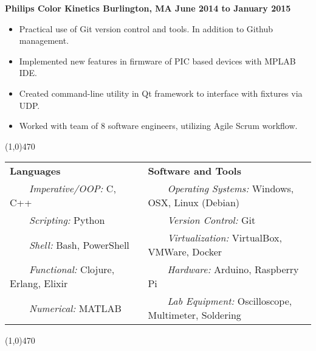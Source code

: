 \documentclass[11pt, a4paper]{article} %
\newcommand{\tinybullet}{ {\tiny \textbullet} }
\newcommand{\tabitem}{~~\llap{\textbullet}~~}
\begin{document}
\centerline{\bf Philips Color Kinetics \tinybullet \hspace{1pt} Burlington, MA \hfill June 2014 to January 2015}
\begin{itemize}
\itemsep0em
	\item Practical use of Git version control and tools. In addition to Github management.
	\item Implemented new features in firmware of PIC based devices with MPLAB IDE.
	\item Created command-line utility in Qt framework to interface with fixtures via UDP.
	\item Worked with team of 8 software engineers, utilizing Agile Scrum workflow.
\end{itemize}

\noindent \line(1,0){470}\\

 \smallskip
\vspace{-10pt}
\begin{center}
\begin{tabular}{l|l}
	{\bf Languages} & {\bf Software and Tools} \\
	\tabitem \textit{Imperative/OOP:} C, C++ & \tabitem \textit{Operating Systems:} Windows, OSX, Linux (Debian)\\
	\tabitem \textit{Scripting:} Python & \tabitem \textit{Version Control:} Git\\
	\tabitem \textit{Shell:} Bash, PowerShell & \tabitem \textit{Virtualization:} VirtualBox, VMWare, Docker \\
	\tabitem \textit{Functional:} Clojure, Erlang, Elixir & \tabitem \textit{Hardware:} Arduino, Raspberry Pi\\
	\tabitem \textit{Numerical:} MATLAB & \tabitem \textit{Lab Equipment:} Oscilloscope, Multimeter, Soldering \\
\end{tabular}
\end{center}

\noindent \line(1,0){470} \\
\end{document}
